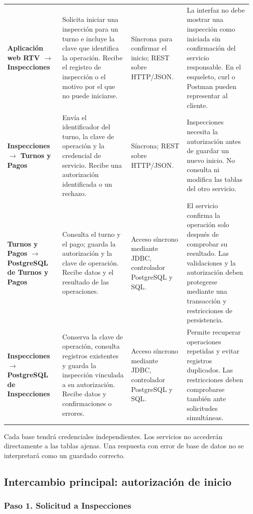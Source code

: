 \documentclass[11pt,a4paper]{article}
\begin{document}
\begin{xltabular}{\textwidth}{L{2.9cm}XXX}
		\textbf{Aplicación web RTV $\rightarrow$ Inspecciones} & Solicita iniciar una inspección para un turno e incluye la clave que identifica la operación. Recibe el registro de inspección o el motivo por el que no puede iniciarse. & Síncrona para confirmar el inicio; REST sobre HTTP/JSON. & La interfaz no debe mostrar una inspección como iniciada sin confirmación del servicio responsable. En el esqueleto, curl o Postman pueden representar al cliente. \\
		\textbf{Inspecciones $\rightarrow$ Turnos y Pagos} & Envía el identificador del turno, la clave de operación y la credencial de servicio. Recibe una autorización identificada o un rechazo. & Síncrona; REST sobre HTTP/JSON. & Inspecciones necesita la autorización antes de guardar un nuevo inicio. No consulta ni modifica las tablas del otro servicio. \\
		\textbf{Turnos y Pagos $\rightarrow$ PostgreSQL de Turnos y Pagos} & Consulta el turno y el pago; guarda la autorización y la clave de operación. Recibe datos y el resultado de las operaciones. & Acceso síncrono mediante JDBC, controlador PostgreSQL y SQL. & El servicio confirma la operación solo después de comprobar su resultado. Las validaciones y la autorización deben protegerse mediante una transacción y restricciones de persistencia. \\
		\textbf{Inspecciones $\rightarrow$ PostgreSQL de Inspecciones} & Conserva la clave de operación, consulta registros existentes y guarda la inspección vinculada a su autorización. Recibe datos y confirmaciones o errores. & Acceso síncrono mediante JDBC, controlador PostgreSQL y SQL. & Permite recuperar operaciones repetidas y evitar registros duplicados. Las restricciones deben comprobarse también ante solicitudes simultáneas. \\
	\end{xltabular}
	
	Cada base tendrá credenciales independientes. Los servicios no accederán directamente a las tablas ajenas. Una respuesta con error de base de datos no se interpretará como un guardado correcto.
	
	\subsection{Intercambio principal: autorización de inicio}
	
	\subsubsection{Paso 1. Solicitud a Inspecciones}
	
\end{document}
